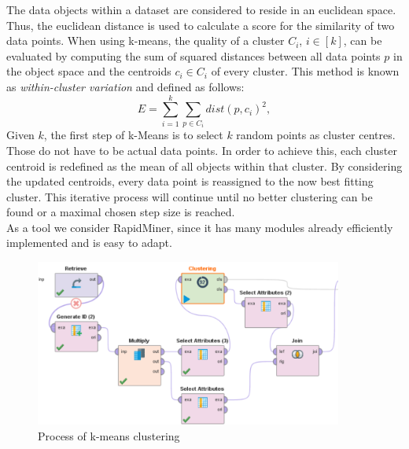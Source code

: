 	The data objects within a dataset are considered to reside in an euclidean space. Thus, the euclidean distance is used to calculate a score for the similarity of two data points. When using k-means, the quality of a cluster $C_i$, $i\in [k]$, can be evaluated by computing the sum of squared distances between all data points $p$ in the object space and the centroids $c_i \in C_i$ of every cluster. This method is known as \textit{within-cluster variation} \cite{data_mining} and defined as follows: 
	\begin{equation}
		E = \sum_{i=1}^{k} \sum_{p \in C_i} dist(p, c_i)^2,
	\end{equation}
	Given $k$, the first step of k-Means is to select $k$ random points as cluster centres. Those do not have to be actual data points.
	In order to achieve this, each cluster centroid is redefined as the mean of all objects within that cluster. By considering the updated centroids, every data point is reassigned to the now best fitting cluster. This iterative process will continue until no better clustering can be found or a maximal chosen step size is reached.\\


	As a tool we consider RapidMiner, since it has many modules already efficiently implemented and is easy to adapt.

	\vspace*{-2em}
	\begin{figure}[H]
		\centering
		\includegraphics[width=0.9\textwidth]{ClusteringRapid.PNG}
		\caption{Process of k-means clustering}
		\label{fig: kclust}
	\end{figure}


